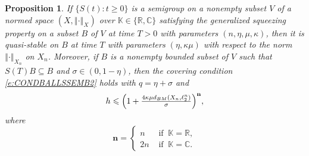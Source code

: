\documentclass[a4paper,12pt,reqno]{amsart}
\theoremstyle{plain}
\newtheorem{prop}[lem]{Proposition}
\theoremstyle{definition}
\numberwithin{equation}{section}
\newcommand{\R}{\mathbb{R}}
\newcommand{\C}{\mathbb{C}}
\newcommand{\norm}[1]{\left\Vert#1\right\Vert}
\renewcommand{\geq}{\geqslant}
\renewcommand{\leq}{\leqslant}
\begin{document}
\begin{prop}\label{prop:SQ2QUASIBANACH}
If  $\{S(t)\colon t\geq 0\}$ is a semigroup on a nonempty subset $V$ of a normed space $(X,\norm{\cdot}_{X})$ over $\mathbb{K}\in\{\R,\C\}$
satisfying the generalized squeezing property on a subset $B$ of $V$ at time $T>0$ with parameters $(n,\eta,\mu,\kappa)$, then it is quasi-stable on $B$ at time $T$ with parameters $(\eta,\kappa\mu)$ with respect to the norm $\norm{\cdot}_{X_n}$ on $X_{n}$. Moreover, if $B$ is a nonempty bounded subset of $V$ such that $S(T)B\subseteq B$ and $\sigma\in(0,1-\eta)$, then the covering condition \eqref{e:CONDBALLSSEMB2} holds with $q=\eta+\sigma$ and
\begin{equation}\label{e:SQUEEZINGWORSE}
h\leq\Bigl(1+\tfrac{4\kappa\mu d_{BM}(X_n,\ell^n_2)}{\sigma}\Bigr)^\mathbf{n},
\end{equation}
where
\begin{equation}\label{e:ELL}
\mathbf{n}=\begin{cases}
n& \text{ if }\ \mathbb{K}=\R,\\
2n&  \text{ if }\ \mathbb{K}=\C.
\end{cases}
\end{equation}
\end{prop}
\end{document}
